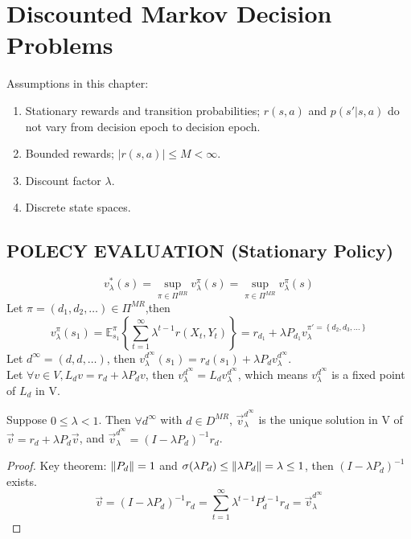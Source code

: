 
\section{Discounted Markov Decision Problems}%
\label{sec:discounted_markov_decision_problems}

Assumptions in this chapter:
\begin{enumerate}
    \item Stationary rewards and transition probabilities; $ r(s, a) $ and $ p(s' | s, a) $ do not vary from decision epoch to decision epoch.
    \item Bounded rewards; $ \left| r(s, a) \right| \le M < \infty $.
    \item Discount factor $ \lambda $.
    \item Discrete state spaces.
\end{enumerate}

\subsection{POLECY EVALUATION (Stationary Policy)}%
\label{sub:polecy_evaluation}

\[
    v^*_\lambda(s) = \sup_{\pi \in \Pi^{HR}} v^\pi_\lambda(s) = \sup_{\pi \in \Pi^{MR}} v^\pi_\lambda(s)
\]
Let $ \pi = (d_1, d_2, \ldots) \in \Pi^{MR} $,then 
\[
    v^\pi_\lambda(s_1) = \mathbb{E}^\pi_{s_1} \left\{ \sum^{\infty}_{t=1} \lambda^{t-1} r(X_t, Y_t) \right\}
    = r_{d_1} + \lambda P_{d_1} v^{\pi' = \left\{ d_2, d_3, \ldots \right\}}_\lambda
\]
Let $ d^\infty = (d, d, \ldots) $, then $ v^{d^\infty}_\lambda(s_1) = r_d(s_1) + \lambda P_d v^{d^\infty}_\lambda $. \\
Let $ \forall v \in V, L_d v = r_d + \lambda P_d v $, then $ v^{d^\infty}_\lambda = L_d v^{d^\infty}_\lambda $, which means $ v^{d^\infty}_\lambda $ is a fixed point of $ L_d $ in V.

\begin{theorem}
Suppose $ 0 \le \lambda < 1 $. Then $ \forall d^\infty $ with $ d \in D^{MR} $, $ \vec v^{d^\infty}_\lambda $ is the unique solution in V of $ \vec v = r_d + \lambda P_d \vec v $, and $ \vec v^{d^\infty}_\lambda = {(I - \lambda P_d)}^{-1} r_d $.
    \begin{proof}
        Key theorem:
    $ \Arrowvert P_d \Arrowvert = 1 $ and $ \sigma (\lambda P_d) \le \Arrowvert \lambda P_d \Arrowvert = \lambda \le 1$, then $ {(I - \lambda P_d)}^{-1} $ exists.
        \[
            \vec v = {(I - \lambda P_d)}^{-1} r_d = \sum^{\infty}_{t=1} \lambda^{t-1} P^{t-1}_d r_d = \vec v^{d^\infty}_\lambda
        \]
    \end{proof}
\end{theorem}

